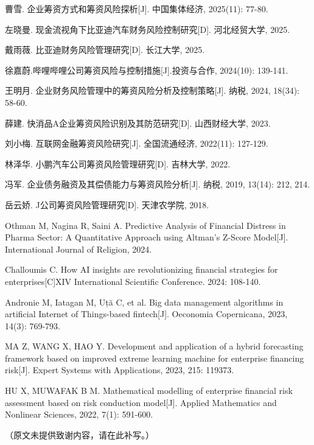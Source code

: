 \documentclass[12pt,a4paper,fontset=windows,UTF8]{ctexart}
\begin{document}
\begin{thesref}
  \item 曹雪. 企业筹资方式和筹资风险探析[J]. 中国集体经济, 2025(11): 77-80.
  \item 左晓曼. 现金流视角下比亚迪汽车财务风险控制研究[D]. 河北经贸大学, 2025.
  \item 戴雨薇. 比亚迪财务风险管理研究[D]. 长江大学, 2025.
  \item 徐嘉蔚.哔哩哔哩公司筹资风险与控制措施[J].投资与合作, 2024(10): 139-141.
  \item 王明月. 企业财务风险管理中的筹资风险分析及控制策略[J]. 纳税, 2024, 18(34): 58-60.
  \item 薛建. 快消品A企业筹资风险识别及其防范研究[D]. 山西财经大学, 2023.
  \item 刘小梅. 互联网金融筹资风险研究[J]. 全国流通经济, 2022(11): 127-129.
  \item 林泽华. 小鹏汽车公司筹资风险管理研究[D]. 吉林大学, 2022.
  \item 冯军. 企业债务融资及其偿债能力与筹资风险分析[J]. 纳税, 2019, 13(14): 212, 214.
  \item 岳云娇. J公司筹资风险管理研究[D]. 天津农学院, 2018.
  \item Othman M, Nagina R, Saini A. Predictive Analysis of Financial Distress in Pharma Sector: A Quantitative Approach using Altman’s Z-Score Model[J]. International Journal of Religion, 2024.
  \item Challoumis C. How AI insights are revolutionizing financial strategies for enterprises[C]XIV International Scientific Conference. 2024: 108-140.
  \item Andronie M, Iatagan M, Uță C, et al. Big data management algorithms in artificial Internet of Things-based fintech[J]. Oeconomia Copernicana, 2023, 14(3): 769-793.
  \item MA Z, WANG X, HAO Y. Development and application of a hybrid forecasting framework based on improved extreme learning machine for enterprise financing risk[J]. Expert Systems with Applications, 2023, 215: 119373.
  \item HU X, MUWAFAK B M. Mathematical modelling of enterprise financial risk assessment based on risk conduction model[J]. Applied Mathematics and Nonlinear Sciences, 2022, 7(1): 591-600.
\end{thesref}

\vspace*{3\baselineskip}

（原文未提供致谢内容，请在此补写。）
\end{document}
